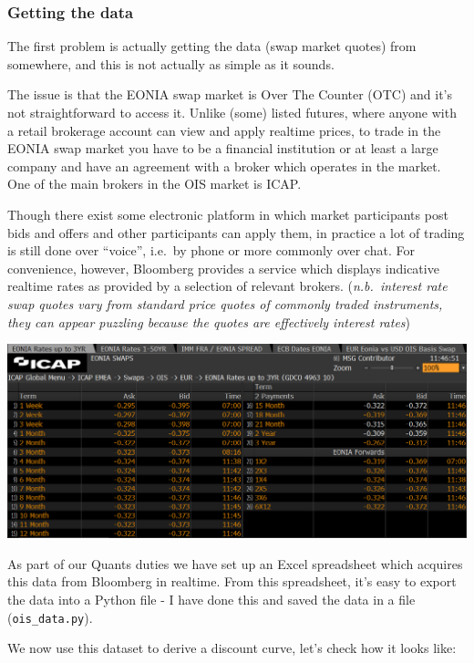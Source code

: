\documentclass[11pt]{article}
\begin{document}
\hypertarget{getting-the-data}{%
\subsubsection{Getting the data}\label{getting-the-data}}

The first problem is actually getting the data (swap market quotes) from
somewhere, and this is not actually as simple as it sounds.

The issue is that the EONIA swap market is Over The Counter (OTC) and
it's not straightforward to access it. Unlike (some) listed futures,
where anyone with a retail brokerage account can view and apply realtime
prices, to trade in the EONIA swap market you have to be a financial
institution or at least a large company and have an agreement with a
broker which operates in the market. One of the main brokers in the OIS
market is ICAP.

Though there exist some electronic platform in which market participants
post bids and offers and other participants can apply them, in practice
a lot of trading is still done over ``voice'', i.e.~by phone or more
commonly over chat. For convenience, however, Bloomberg provides a
service which displays indicative realtime rates as provided by a
selection of relevant brokers. (\emph{n.b.~interest rate swap quotes
vary from standard price quotes of commonly traded instruments, they can
appear puzzling because the quotes are effectively interest rates})

\includegraphics[width=\linewidth]{icap_3.png}

As part of our Quants duties we have set up an Excel spreadsheet which
acquires this data from Bloomberg in realtime. From this spreadsheet,
it's easy to export the data into a Python file - I have done this and
saved the data in a file (\texttt{ois\_data.py}).

We now use this dataset to derive a discount curve, let's check how it
looks like:
\end{document}
